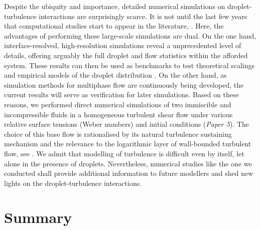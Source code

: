 Despite the ubiquity and importance, detailed numerical simulations on droplet-turbulence interactions are surprisingly scarce. It is not until the last few years that computational studies start to appear in the literature, \eg \cite{perlekar_biferale_sbragaglia_srivastava_toschi_2012a, skartlien_sollum_schumann_2013a, komrakova_eskin_derksen_2015a, scarbolo_bianco_soldati_2015a, dodd_ferrante_2016a}.
Here, the advantages of performing these large-scale simulations are dual.
On the one hand, interface-resolved, high-resolution simulations reveal a unprecedented level of details, offering arguably the full droplet and flow statistics within the afforded system. These results can then be used as benchmarks to test theoretical scalings and empirical models of the droplet distribution \citep{hinze_1955a, deane_stokes_2002a}.
On the other hand, as simulation methods for multiphase flow are continuously being developed, the current results will serve as verification for later simulations.
Based on these reasons, we performed direct numerical simulations of two immiscible and incompressible fluids in a homogeneous turbulent shear flow under various relative surface tensions (\ie Weber numbers) and initial conditions (\emph{Paper 5}).
The choice of this base flow is rationalised by its natural turbulence sustaining mechanism and the relevance to the logarithmic layer of wall-bounded turbulent flow, see \eg \cite{pumir_1996a, sekimoto_dong_jimenez_2016a}.
We admit that modelling of turbulence is difficult even by itself, let alone in the presence of droplets.
Nevertheless, numerical studies like the one we conducted shall provide additional information to future modellers and shed new lights on the droplet-turbulence interactions.



\chapter{Summary}  \label{chp:summary}


